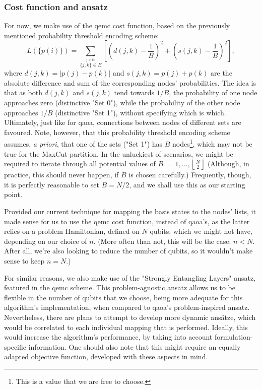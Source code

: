 \subsubsection*{Cost function and ansatz}
For now, we make use of the \acrshort{qemc} cost function, based on the previously mentioned probability threshold encoding scheme:
\begin{equation}
    L(\{p(i)\}) = \sum_{\stackrel{j < k:}{\{j,k\}\in E}}\left[\left(d(j,k)-\frac{1}{B}\right)^{2}+\left(s(j,k)-\frac{1}{B}\right)^{2}\right],
\end{equation}
where $d(j,k) = |p(j) - p(k)|$ and $s(j, k) = p(j) + p(k)$ are the absolute difference and sum of the corresponding nodes' probabilities. The idea is that as both $d(j, k)$ and $s(j, k)$ tend towards $1/B$, the probability of one node approaches zero (distinctive "Set 0"), while the probability of the other node approaches $1/B$ (distinctive "Set 1"), without specifying which is which. Ultimately, just like for \acrshort{qaoa}, connections between nodes of different sets are favoured. Note, however, that this probability threshold encoding scheme assumes, \textit{a priori}, that one of the sets ("Set 1") has $B$ nodes\footnote{This is a value that we are free to choose.}, which may not be true for the MaxCut partition. In the unluckiest of scenarios, we might be required to iterate through all potential values of $B\,=\,1,...,\left\lfloor{\frac{N}{2}}\right\rfloor$ (Although, in practice, this should never happen, if $B$ is chosen carefully.) Frequently, though, it is perfectly reasonable to set $B = N/2$, and we shall use this as our starting point.

Provided our current technique for mapping the basis states to the nodes' lists, it made sense for us to use the \acrshort{qemc} cost function, instead of \acrshort{qaoa}'s, as the latter relies on a problem Hamiltonian, defined on $N$ qubits, which we might not have, depending on our choice of $n$. (More often than not, this will be the case: $n < N$. After all, we're also looking to reduce the number of qubits, so it wouldn't make sense to keep $n = N$.)

For similar reasons, we also make use of the "Strongly Entangling Layers" ansatz, featured in the \acrshort{qemc} scheme. This problem-agnostic ansatz allows us to be flexible in the number of qubits that we choose, being more adequate for this algorithm's implementation, when compared to \acrshort{qaoa}'s problem-inspired ansatz. Nevertheless, there are plans to attempt to develop more dynamic ansätze, which would be correlated to each individual mapping that is performed. Ideally, this would increase the algorithm's performance, by taking into account formulation-specific information. One should also note that this might require an equally adapted objective function, developed with these aspects in mind.

